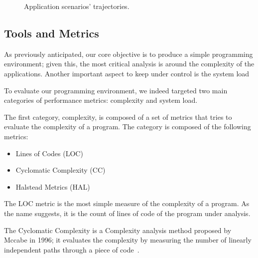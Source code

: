 \begin{figure}[tb]
    \centering
    \quad
    \caption{Application scenarios' trajectories.}\label{fig:application_traj}
\end{figure}

\subsection{Tools and Metrics}\label{subsec:performance_metrics}
As previously anticipated, our core objective is to produce a simple programming environment; given this, the most critical analysis is around the complexity of the applications.
Another important aspect to keep under control is the system load 

To evaluate our programming environment, we indeed targeted two main categories of performance metrics: complexity and system load.

The first category, complexity, is composed of a set of metrics that tries to evaluate the complexity of a program.
The category is composed of the following metrics:
\begin{itemize}
    \item Lines of Codes (LOC)
    \item Cyclomatic Complexity (CC)
    \item Halstead Metrics (HAL)
\end{itemize}

The LOC metric is the most simple measure of the complexity of a program. As the name suggests, it is the count of lines of code of the program under analysis.

The Cyclomatic Complexity is a Complexity analysis method proposed by Mccabe in 1996; it evaluates the complexity by measuring the number of linearly independent paths
through a piece of code~\cite{mccabe1996cyclomatic}.

